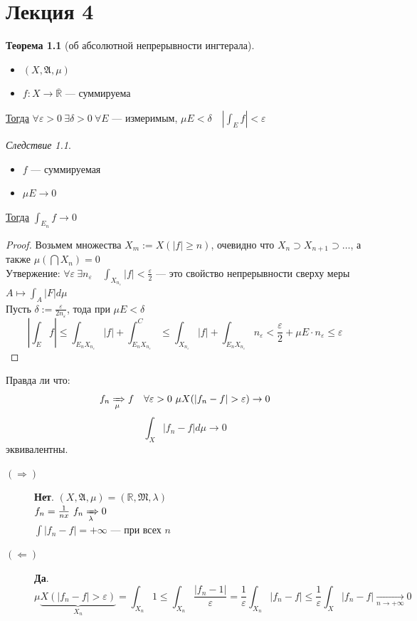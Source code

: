 \documentclass[russ,oneside]{book}
\newcommand{\R}{\mathbb{R}}
\theoremstyle{plain}
\theoremstyle{remark}
\newtheorem{corollary}{Следствие}[theorem]
\theoremstyle{definition}
\newtheorem{theorem}{Теорема}[section]
\begin{document}
\chapter{Лекция 4}
\label{sec:org2aed01d}
\newcommand{\X}{\mathcal{X}}
\newcommand{\A}{\mathfrak{A}}
\newcommand{\B}{\mathfrak{B}}

\begin{theorem}[об абсолютной непрерывности ингтерала]
\-
\begin{itemize}
\item \((X, \A, \mu)\)
\item \(f: X \to \overline{\R}\) --- суммируема
\end{itemize}
\uline{Тогда} \(\forall \varepsilon > 0\ \exists \delta > 0\ \forall E\) --- измеримым, \(\mu E < \delta\quad |\int_E f| < \varepsilon\)
\end{theorem}
\begin{corollary}
\-
\begin{itemize}
\item \(f\) --- суммируемая
\item \(\mu E \to 0\)
\end{itemize}
\uline{Тогда} \(\int_{E_n} f \to 0\)
\end{corollary}
\begin{proof}
Возьмем множества \(X_m := X(|f| \ge n)\), очевидно что \(X_n \supset X_{n + 1} \supset \dots\), а также \(\mu(\bigcap X_n) = 0\) \\
Утвержение: \(\forall \varepsilon\ \exists n_\varepsilon\quad \int_{X_{n_\varepsilon}}|f| < \frac{\varepsilon}{2}\) ---
это свойство непрерывности сверху меры \(A \mapsto \int_A |F| d\mu\) \\
Пусть \(\delta:=\frac{\varepsilon}{2n_\varepsilon}\), тода при \(\mu E < \delta\)
\[ \left|\int_E f\right| \le\int_{E_nX_{n_\varepsilon}}|f| + \int_{E_nX_{n_\varepsilon}}^C \le \int_{X_{n_\varepsilon}} |f| + \int_{E_nX_{n_\varepsilon}} n_\varepsilon < \frac{\varepsilon}{2} + \mu E\cdot n_\varepsilon \le \varepsilon \]
\end{proof}
Правда ли что:
\[ f_n \xRightarrow[\mu]{} f\quad \forall \varepsilon > 0\ \mu X(|f_n - f| > \varepsilon) \to 0\]
\[ \int_X|f_n - f| d\mu \to 0 \]
эквивалентны.
\begin{description}
\item[{\((\Rightarrow)\)}] \textbf{Нет}. \((X, \A, \mu) = (\R, \mathfrak{M}, \lambda)\) \\
\(f_n = \frac{1}{nx}\ f_n \xRightarrow[\lambda]{} 0\) \\
\(\int|f_n - f| = + \infty\) --- при всех \(n\)
\item[{\((\Leftarrow)\)}] \textbf{Да}. \[\mu \underbrace{X(|f_n - f| > \varepsilon)}_{X_n} = \int_{X_n} 1 \le \int_{X_n} \frac{|f_n - 1|}{\varepsilon} = \frac{1}{\varepsilon}\int_{X_n}|f_n - f| \le \frac{1}{\varepsilon}\int_X|f_n - f| \xrightarrow[n\to +\infty]{} 0\]
\end{description}
\end{document}
